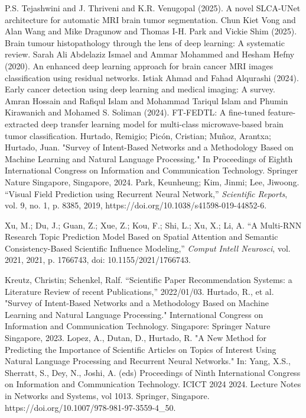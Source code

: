 \documentclass[runningheads]{llncs}
\begin{document}
\begin{thebibliography}{00}
     P.S. Tejashwini and J. Thriveni and K.R. Venugopal (2025). A novel SLCA-UNet architecture for automatic MRI brain tumor segmentation.
 Chun Kiet Vong and Alan Wang and Mike Dragunow and Thomas I-H. Park and Vickie Shim (2025). Brain tumour histopathology through the lens of deep learning: A systematic review.
 Sarah Ali {Abdelaziz Ismael} and Ammar Mohammed and Hesham Hefny (2020). An enhanced deep learning approach for brain cancer MRI images classification using residual networks.
 Istiak Ahmad and Fahad Alqurashi (2024). Early cancer detection using deep learning and medical imaging: A survey.
 Amran Hossain and Rafiqul Islam and Mohammad Tariqul Islam and Phumin Kirawanich and Mohamed S. Soliman (2024). FT-FEDTL: A fine-tuned feature-extracted deep transfer learning model for multi-class microwave-based brain tumor classification.
    Hurtado, Remigio; Picón, Cristian; Muñoz, Arantxa; Hurtado, Juan.
    "Survey of Intent-Based Networks and a Methodology Based on Machine Learning and Natural Language Processing."
    In Proceedings of Eighth International Congress on Information and Communication Technology.
    Springer Nature Singapore, Singapore, 2024.
    Park, Keunheung; Kim, Jinmi; Lee, Jiwoong. 
    ``Visual Field Prediction using Recurrent Neural Network,'' 
    \emph{Scientific Reports}, 
    vol. 9, no. 1, p. 8385, 
    2019, 
    https://doi.org/10.1038/s41598-019-44852-6.
    
    Xu, M.; Du, J.; Guan, Z.; Xue, Z.; Kou, F.; Shi, L.; Xu, X.; Li, A. 
    ``A Multi-RNN Research Topic Prediction Model Based on Spatial Attention and Semantic Consistency-Based Scientific Influence Modeling,'' 
    \emph{Comput Intell Neurosci}, 
    vol. 2021, 
    2021, 
    p. 1766743, 
    doi: 10.1155/2021/1766743.
    
    Kreutz, Christin; Schenkel, Ralf.
    ``Scientific Paper Recommendation Systems: a Literature Review of recent Publications,''
    2022/01/03.
	 Hurtado, R., et al. "Survey of Intent-Based Networks and a Methodology Based on Machine Learning and Natural Language Processing." International Congress on Information and Communication Technology. Singapore: Springer Nature Singapore, 2023.
     Lopez, A., Dutan, D., Hurtado, R. "A New Method for Predicting the Importance of Scientific Articles on Topics of Interest Using Natural Language Processing and Recurrent Neural Networks." In: Yang, X.S., Sherratt, S., Dey, N., Joshi, A. (eds) Proceedings of Ninth International Congress on Information and Communication Technology. ICICT 2024 2024. Lecture Notes in Networks and Systems, vol 1013. Springer, Singapore. https://doi.org/10.1007/978-981-97-3559-4\_50.
\end{thebibliography}
\end{document}
